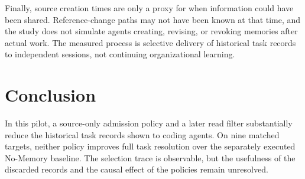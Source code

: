 \documentclass[sigconf,anonymous]{aamas}
\begin{document}
Finally, source creation times are only a proxy for when information could have been shared. Reference-change paths may not have been known at that time, and the study does not simulate agents creating, revising, or revoking memories after actual work. The measured process is selective delivery of historical task records to independent sessions, not continuing organizational learning.

\section{Conclusion}
In this pilot, a source-only admission policy and a later read filter substantially reduce the historical task records shown to coding agents. On nine matched targets, neither policy improves full task resolution over the separately executed No-Memory baseline. The selection trace is observable, but the usefulness of the discarded records and the causal effect of the policies remain unresolved.



\end{document}
